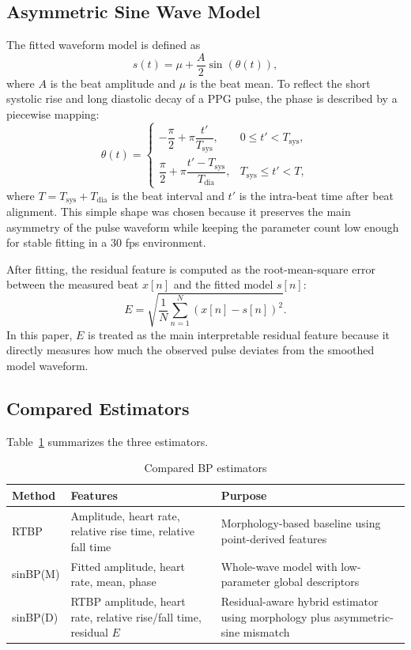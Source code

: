 \documentclass[twocolumn]{svjour3}
\begin{document}
\subsection{Asymmetric Sine Wave Model}
The fitted waveform model is defined as
\begin{equation}
s(t) = \mu + \frac{A}{2}\sin(\theta(t)),
\label{eq:model}
\end{equation}
where $A$ is the beat amplitude and $\mu$ is the beat mean. To reflect the short systolic rise and long diastolic decay of a PPG pulse, the phase is described by a piecewise mapping:
\begin{equation}
\theta(t) =
\begin{cases}
-\dfrac{\pi}{2} + \pi\dfrac{t'}{T_{\mathrm{sys}}}, & 0 \le t' < T_{\mathrm{sys}},\\[6pt]
\dfrac{\pi}{2} + \pi\dfrac{t' - T_{\mathrm{sys}}}{T_{\mathrm{dia}}}, & T_{\mathrm{sys}} \le t' < T,
\end{cases}
\label{eq:phase}
\end{equation}
where $T = T_{\mathrm{sys}} + T_{\mathrm{dia}}$ is the beat interval and $t'$ is the intra-beat time after beat alignment. This simple shape was chosen because it preserves the main asymmetry of the pulse waveform while keeping the parameter count low enough for stable fitting in a 30 fps environment.

After fitting, the residual feature is computed as the root-mean-square error between the measured beat $x[n]$ and the fitted model $s[n]$:
\begin{equation}
E = \sqrt{\frac{1}{N}\sum_{n=1}^{N}(x[n]-s[n])^{2}}.
\label{eq:residual}
\end{equation}
In this paper, $E$ is treated as the main interpretable residual feature because it directly measures how much the observed pulse deviates from the smoothed model waveform.

\subsection{Compared Estimators}
Table~\ref{tab:methods} summarizes the three estimators.

\begin{table}[t]
\caption{Compared BP estimators}
\label{tab:methods}
\centering
\footnotesize
\begin{tabular}{>{\raggedright\arraybackslash}p{1.45cm} >{\raggedright\arraybackslash}p{2.2cm} >{\raggedright\arraybackslash}p{3.0cm}}
\toprule
Method & Features & Purpose \\
\midrule
RTBP & Amplitude, heart rate, relative rise time, relative fall time & Morphology-based baseline using point-derived features \\
sinBP(M) & Fitted amplitude, heart rate, mean, phase & Whole-wave model with low-parameter global descriptors \\
sinBP(D) & RTBP amplitude, heart rate, relative rise/fall time, residual $E$ & Residual-aware hybrid estimator using morphology plus asymmetric-sine mismatch \\
\bottomrule
\end{tabular}
\end{table}
\end{document}
